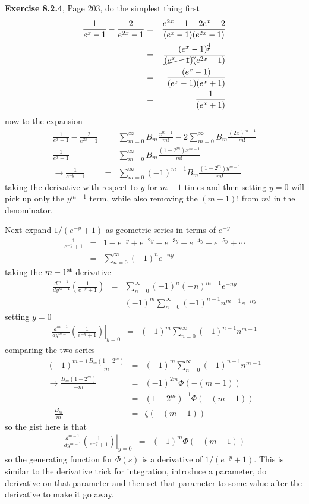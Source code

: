 \documentclass[aps,preprint,preprintnumbers,nofootinbib,showpacs,prd]{revtex4-1}
\newcommand{\nbea}{\begin{eqnarray*}}
\newcommand{\neea}{\end{eqnarray*}}
\begin{document}
{\bf Exercise 8.2.4}, Page 203, do the simplest thing first
%
\nbea
\frac{1}{e^x - 1} - \frac{2}{e^{2x}-1} & = & \frac{e^{2x} - 1 - 2e^x + 2}{(e^{x} - 1)(e^{2x} - 1)} \\
& = & \frac{(e^x - 1)^{\cancel{2}}}{\cancel{(e^{x} - 1)}(e^{2x} - 1)} \\
& = & \frac{(e^x - 1)}{(e^{x} - 1)(e^{x} + 1)} \\
& = & \frac{1}{(e^{x} + 1)}
\neea
%
now to the expansion
%
\nbea
\frac{1}{e^x - 1} - \frac{2}{e^{2x}-1} & = & \sum_{m=0}^\infty B_m\frac{x^{m-1}}{m!} - 2\sum_{m=0}^\infty B_m\frac{(2x)^{m-1}}{m!} \\
\frac{1}{e^x + 1} & = & \sum_{m=0}^\infty B_m\frac{(1-2^m)x^{m-1}}{m!} \\
\to \frac{1}{e^{-y} + 1} & = & \sum_{m=0}^\infty (-1)^{m-1}B_m\frac{(1-2^m)y^{m-1}}{m!}
\neea
%
taking the derivative with respect to $y$ for $m-1$ times and then setting $y=0$ will pick up only the $y^{m-1}$ term, while also removing the $(m-1)!$ from $m!$ in the denominator.

Next expand $1/(e^{-y} + 1)$ as geometric series in terms of $e^{-y}$
%
\nbea
\frac{1}{e^{-y} + 1} & = & 1 - e^{-y} + e^{-2y} - e^{-3y} + e^{-4y} - e^{-5y} + \cdots \\
& = & \sum_{n=0}^\infty (-1)^n e^{-ny}
\neea
%
taking the $m-1^{\rm st}$ derivative
%
\nbea
\frac{d^{m-1}}{dy^{m-1}} \left(\frac{1}{e^{-y} + 1}\right) & = & \sum_{n=0}^\infty (-1)^n (-n)^{m-1} e^{-ny} \\
& = & (-1)^m \sum_{n=0}^\infty (-1)^{n-1} n^{m-1} e^{-ny}
\neea
%
setting $y=0$
%
\nbea
\left.\frac{d^{m-1}}{dy^{m-1}} \left(\frac{1}{e^{-y} + 1}\right) \right|_{y=0} & = & (-1)^m \sum_{n=0}^\infty (-1)^{n-1} n^{m-1}
\neea
%
comparing the two series
%
\nbea
(-1)^{m-1} \frac{B_m(1-2^m)}{m} & = & (-1)^m \sum_{n=0}^\infty (-1)^{n-1} n^{m-1} \\
\to \frac{B_m(1-2^m)}{-m} & = & (-1)^{2m} \Phi(-(m-1)) \\
& = & (1-2^m)^{-1}\Phi(-(m-1)) \\
-\frac{B_m}{m} & = & \zeta(-(m-1))
\neea
%
so the gist here is that
%
\nbea
\left.\frac{d^{m-1}}{dy^{m-1}} \left(\frac{1}{e^{-y} + 1}\right) \right|_{y=0} & = & (-1)^m \Phi(-(m-1))
\neea
%
so the generating function for $\Phi(s)$ is a derivative of $1/(e^{-y} + 1)$. This is similar to the derivative trick for integration, introduce a parameter, do derivative on that parameter and then set that parameter to some value after the derivative to make it go away.
\end{document}
